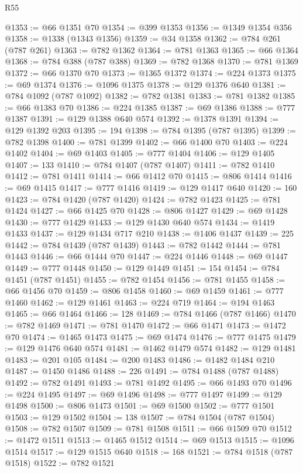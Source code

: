 \begin{lexlean}{R55}
\begin{coremodule}
@1353 := @66 @1351 @70
@1354 := @399 @1353
@1356 := @1349 @1354 @356
@1358 := @1338 (@1343 @1356)
@1359 := @34 @1358
@1362 := @784 @261 (@787 @261)
@1363 := @782 @1362
@1364 := @781 @1363
@1365 := @66 @1364
@1368 := @784 @388 (@787 @388)
@1369 := @782 @1368
@1370 := @781 @1369
@1372 := @66 @1370 @70
@1373 := @1365 @1372
@1374 := @224 @1373
@1375 := @69 @1374
@1376 := @1096 @1375
@1378 := @129 @1376 @640
@1381 := @784 @1092 (@787 @1092)
@1382 := @782 @1381
@1383 := @781 @1382
@1385 := @66 @1383 @70
@1386 := @224 @1385
@1387 := @69 @1386
@1388 := @777 @1387
@1391 := @129 @1388 @640 @574
@1392 := @1378 @1391
@1394 := @129 @1392 @203
@1395 := 194
@1398 := @784 @1395 (@787 @1395)
@1399 := @782 @1398
@1400 := @781 @1399
@1402 := @66 @1400 @70
@1403 := @224 @1402
@1404 := @69 @1403
@1405 := @777 @1404
@1406 := @129 @1405
@1407 := 133
@1410 := @784 @1407 (@787 @1407)
@1411 := @782 @1410
@1412 := @781 @1411
@1414 := @66 @1412 @70
@1415 := @806 @1414
@1416 := @69 @1415
@1417 := @777 @1416
@1419 := @129 @1417 @640
@1420 := 160
@1423 := @784 @1420 (@787 @1420)
@1424 := @782 @1423
@1425 := @781 @1424
@1427 := @66 @1425 @70
@1428 := @806 @1427
@1429 := @69 @1428
@1430 := @777 @1429
@1433 := @129 @1430 @640 @574
@1434 := @1419 @1433
@1437 := @129 @1434 @717 @210
@1438 := @1406 @1437
@1439 := 225
@1442 := @784 @1439 (@787 @1439)
@1443 := @782 @1442
@1444 := @781 @1443
@1446 := @66 @1444 @70
@1447 := @224 @1446
@1448 := @69 @1447
@1449 := @777 @1448
@1450 := @129 @1449
@1451 := 154
@1454 := @784 @1451 (@787 @1451)
@1455 := @782 @1454
@1456 := @781 @1455
@1458 := @66 @1456 @70
@1459 := @806 @1458
@1460 := @69 @1459
@1461 := @777 @1460
@1462 := @129 @1461
@1463 := @224 @719
@1464 := @194 @1463
@1465 := @66 @1464
@1466 := 128
@1469 := @784 @1466 (@787 @1466)
@1470 := @782 @1469
@1471 := @781 @1470
@1472 := @66 @1471
@1473 := @1472 @70
@1474 := @1465 @1473
@1475 := @69 @1474
@1476 := @777 @1475
@1479 := @129 @1476 @640 @574
@1481 := @1462 @1479 @574
@1482 := @129 @1481
@1483 := @201 @105
@1484 := @200 @1483
@1486 := @1482 @1484 @210
@1487 := @1450 @1486
@1488 := 226
@1491 := @784 @1488 (@787 @1488)
@1492 := @782 @1491
@1493 := @781 @1492
@1495 := @66 @1493 @70
@1496 := @224 @1495
@1497 := @69 @1496
@1498 := @777 @1497
@1499 := @129 @1498
@1500 := @806 @1473
@1501 := @69 @1500
@1502 := @777 @1501
@1503 := @129 @1502
@1504 := 138
@1507 := @784 @1504 (@787 @1504)
@1508 := @782 @1507
@1509 := @781 @1508
@1511 := @66 @1509 @70
@1512 := @1472 @1511
@1513 := @1465 @1512
@1514 := @69 @1513
@1515 := @1096 @1514
@1517 := @129 @1515 @640
@1518 := 168
@1521 := @784 @1518 (@787 @1518)
@1522 := @782 @1521

\end{coremodule}
\end{lexlean}
